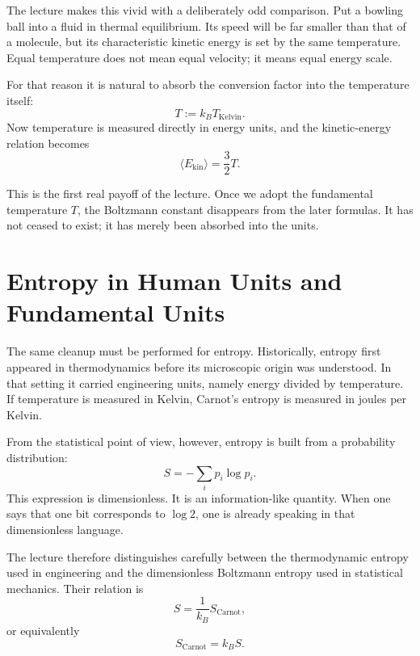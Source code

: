 The lecture makes this vivid with a deliberately odd comparison. Put a bowling ball into a fluid in thermal equilibrium. Its speed will be far smaller than that of a molecule, but its characteristic kinetic energy is set by the same temperature. Equal temperature does not mean equal velocity; it means equal energy scale.

For that reason it is natural to absorb the conversion factor into the temperature itself:
\begin{equation}
T := k_B T_{\mathrm{Kelvin}}.
\end{equation}
Now temperature is measured directly in energy units, and the kinetic-energy relation becomes
\begin{equation}
\langle E_{\mathrm{kin}}\rangle = \frac{3}{2}T.
\end{equation}

This is the first real payoff of the lecture. Once we adopt the fundamental temperature \(T\), the Boltzmann constant disappears from the later formulas. It has not ceased to exist; it has merely been absorbed into the units.

\section{Entropy in Human Units and Fundamental Units}

The same cleanup must be performed for entropy. Historically, entropy first appeared in thermodynamics before its microscopic origin was understood. In that setting it carried engineering units, namely energy divided by temperature. If temperature is measured in Kelvin, Carnot's entropy is measured in joules per Kelvin.

From the statistical point of view, however, entropy is built from a probability distribution:
\begin{equation}
S = -\sum_i p_i \log p_i.
\end{equation}
This expression is dimensionless. It is an information-like quantity. When one says that one bit corresponds to \(\log 2\), one is already speaking in that dimensionless language.

The lecture therefore distinguishes carefully between the thermodynamic entropy used in engineering and the dimensionless Boltzmann entropy used in statistical mechanics. Their relation is
\begin{equation}
S = \frac{1}{k_B} S_{\mathrm{Carnot}},
\end{equation}
or equivalently
\begin{equation}
S_{\mathrm{Carnot}} = k_B S.
\end{equation}

